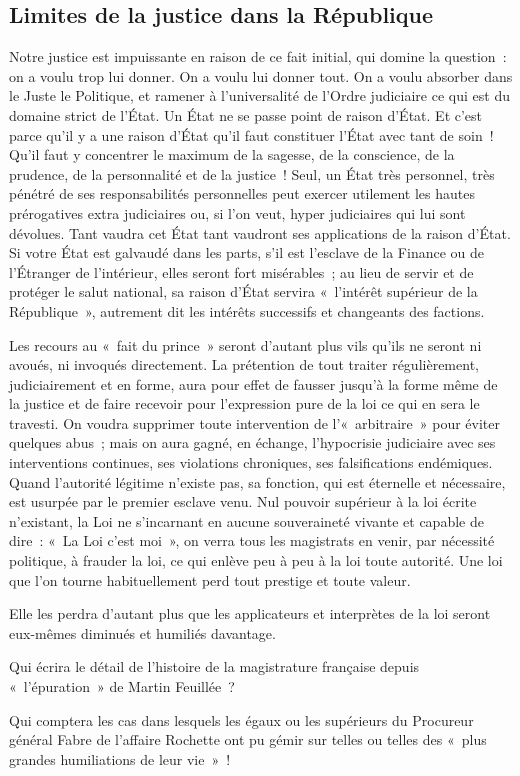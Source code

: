 \documentclass[french,twoside]{book} %
\begin{document}
\subsection[{Limites de la justice dans la République}]{Limites de la justice dans la République}
\noindent Notre justice est impuissante en raison de ce fait initial, qui domine la question : on a voulu trop lui donner. On a voulu lui donner tout. On a voulu absorber dans le Juste le Politique, et ramener à l’universalité de l’Ordre judiciaire ce qui est du domaine strict de l’État. Un État ne se passe point de raison d’État. Et c’est parce qu’il y a une raison d’État qu’il faut constituer l’État avec tant de soin ! Qu’il faut y concentrer le maximum de la sagesse, de la conscience, de la prudence, de la personnalité et de la justice ! Seul, un État très personnel, très pénétré de ses responsabilités personnelles peut exercer utilement les hautes prérogatives extra judiciaires ou, si l’on veut, hyper judiciaires qui lui sont dévolues. Tant vaudra cet État tant vaudront ses applications de la raison d’État. Si votre État est galvaudé dans les parts, s’il est l’esclave de la Finance ou de l’Étranger de l’intérieur, elles seront fort misérables ; au lieu de servir et de protéger le salut national, sa raison d’État servira « l’intérêt supérieur de la République », autrement dit les intérêts successifs et changeants des factions.\par
Les recours au « fait du prince » seront d’autant plus vils qu’ils ne seront ni avoués, ni invoqués directement. La prétention de tout traiter régulièrement, judiciairement et en forme, aura pour effet de fausser jusqu’à la forme même de la justice et de faire recevoir pour l’expression pure de la loi ce qui en sera le travesti. On voudra supprimer toute intervention de l’« arbitraire » pour éviter quelques abus ; mais on aura gagné, en échange, l’hypocrisie judiciaire avec ses interventions continues, ses violations chroniques, ses falsifications endémiques. Quand l’autorité légitime n’existe pas, sa fonction, qui est éternelle et nécessaire, est usurpée par le premier esclave venu. Nul pouvoir supérieur à la loi écrite n’existant, la Loi ne s’incarnant en aucune souveraineté vivante et capable de dire : « La Loi c’est moi », on verra tous les magistrats en venir, par nécessité politique, à frauder la loi, ce qui enlève peu à peu à la loi toute autorité. Une loi que l’on tourne habituellement perd tout prestige et toute valeur.\par
Elle les perdra d’autant plus que les applicateurs et interprètes de la loi seront eux-mêmes diminués et humiliés davantage.\par
Qui écrira le détail de l’histoire de la magistrature française depuis « l’épuration » de Martin Feuillée ?\par
Qui comptera les cas dans lesquels les égaux ou les supérieurs du Procureur général Fabre de l’affaire Rochette ont pu gémir sur telles ou telles des « plus grandes humiliations de leur vie » !
\end{document}
